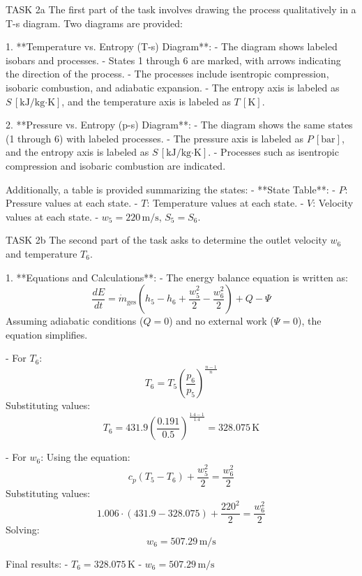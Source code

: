 TASK 2a  
The first part of the task involves drawing the process qualitatively in a T-s diagram. Two diagrams are provided:  

1. **Temperature vs. Entropy (T-s) Diagram**:  
   - The diagram shows labeled isobars and processes.  
   - States 1 through 6 are marked, with arrows indicating the direction of the process.  
   - The processes include isentropic compression, isobaric combustion, and adiabatic expansion.  
   - The entropy axis is labeled as \( S \, [\text{kJ}/\text{kg·K}] \), and the temperature axis is labeled as \( T \, [\text{K}] \).  

2. **Pressure vs. Entropy (p-s) Diagram**:  
   - The diagram shows the same states (1 through 6) with labeled processes.  
   - The pressure axis is labeled as \( P \, [\text{bar}] \), and the entropy axis is labeled as \( S \, [\text{kJ}/\text{kg·K}] \).  
   - Processes such as isentropic compression and isobaric combustion are indicated.  

Additionally, a table is provided summarizing the states:  
- **State Table**:  
  - \( P \): Pressure values at each state.  
  - \( T \): Temperature values at each state.  
  - \( V \): Velocity values at each state.  
  - \( w_5 = 220 \, \text{m/s} \), \( S_5 = S_6 \).  

TASK 2b  
The second part of the task asks to determine the outlet velocity \( w_6 \) and temperature \( T_6 \).  

1. **Equations and Calculations**:  
   - The energy balance equation is written as:  
     \[
     \frac{dE}{dt} = \dot{m}_{\text{ges}} \left( h_5 - h_6 + \frac{w_5^2}{2} - \frac{w_6^2}{2} \right) + Q - \Psi
     \]  
     Assuming adiabatic conditions (\( Q = 0 \)) and no external work (\( \Psi = 0 \)), the equation simplifies.  

   - For \( T_6 \):  
     \[
     T_6 = T_5 \left( \frac{p_6}{p_5} \right)^{\frac{n-1}{n}}
     \]  
     Substituting values:  
     \[
     T_6 = 431.9 \left( \frac{0.191}{0.5} \right)^{\frac{1.4-1}{1.4}} = 328.075 \, \text{K}
     \]  

   - For \( w_6 \):  
     Using the equation:  
     \[
     c_p(T_5 - T_6) + \frac{w_5^2}{2} = \frac{w_6^2}{2}
     \]  
     Substituting values:  
     \[
     1.006 \cdot (431.9 - 328.075) + \frac{220^2}{2} = \frac{w_6^2}{2}
     \]  
     Solving:  
     \[
     w_6 = 507.29 \, \text{m/s}
     \]  

Final results:  
- \( T_6 = 328.075 \, \text{K} \)  
- \( w_6 = 507.29 \, \text{m/s} \)
